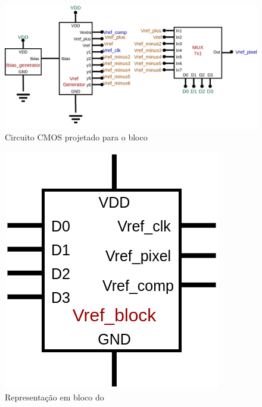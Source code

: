 \begin{figure}[htb]
 \label{NomePFig}
 \centering
    \centering
    \caption{Circuito CMOS projetado para o bloco \NomeBloco} \label{\NomePFig}
    \includegraphics[scale=0.3]{Circuitos/vref_block.png}
\end{figure}

\begin{figure}[htb]
 \label{NomeSFig}
 \centering
    \centering
    \caption{Representa{\c c}\~ao em bloco do \NomeBloco} \label{NomeSFig}
    \includegraphics[scale=0.3]{Circuitos/vref_block_block.png}
\end{figure}
